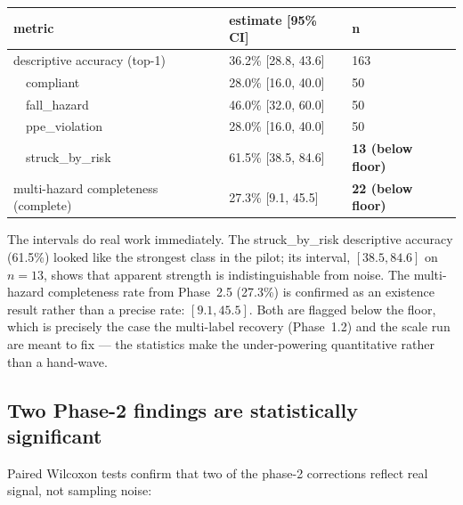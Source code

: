 \begin{center}
\begin{tabular}{p{5.0cm}p{4.6cm}p{2.6cm}}
\toprule
\textbf{metric} & \textbf{estimate [95\% CI]} & \textbf{n} \\
\midrule
descriptive accuracy (top-1)          & 36.2\% [28.8, 43.6] & 163 \\
\ \ compliant                          & 28.0\% [16.0, 40.0] & 50 \\
\ \ fall\_hazard                       & 46.0\% [32.0, 60.0] & 50 \\
\ \ ppe\_violation                     & 28.0\% [16.0, 40.0] & 50 \\
\ \ struck\_by\_risk                   & 61.5\% [38.5, 84.6] & \textbf{13 (below floor)} \\
multi-hazard completeness (complete)  & 27.3\% [9.1, 45.5]  & \textbf{22 (below floor)} \\
\bottomrule
\end{tabular}
\label{tab:p31-ci}
\end{center}

The intervals do real work immediately. The struck\_by\_risk descriptive accuracy (61.5\%) looked like
the strongest class in the pilot; its interval, $[38.5, 84.6]$ on $n{=}13$, shows that apparent strength
is indistinguishable from noise. The multi-hazard completeness rate from Phase~2.5 (27.3\%) is confirmed
as an existence result rather than a precise rate: $[9.1, 45.5]$. Both are flagged below the floor,
which is precisely the case the multi-label recovery (Phase~1.2) and the scale run are meant to fix ---
the statistics make the under-powering quantitative rather than a hand-wave.

\subsection{Two Phase-2 findings are statistically significant}

Paired Wilcoxon tests confirm that two of the phase-2 corrections reflect real signal, not sampling
noise:

